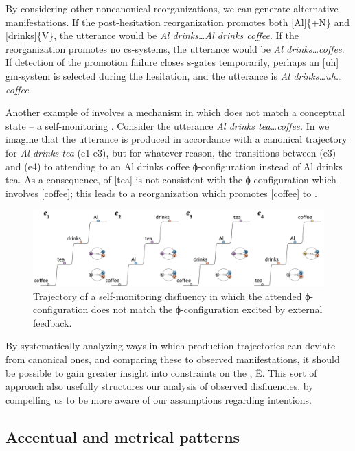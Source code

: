   By considering other noncanonical reorganizations, we can generate alternative manifestations. If the post-hesitation reorganization promotes both [Al]\{+N\} and [drinks]\{V\}, the utterance would be \textit{Al drinks…Al drinks coffee}. If the reorganization promotes no cs-systems, the utterance would be \textit{Al drinks…coffee}. If detection of the promotion failure closes s-gates temporarily, perhaps an [uh] gm-sys\-tem is selected during the hesitation, and the utterance is \textit{Al drinks…uh…coffee}.

  Another example of  involves a mechanism in which  does not match a conceptual state -- a self-monitoring . Consider the utterance \textit{Al drinks tea…coffee.} In {} we imagine that the utterance is produced in accordance with a canonical trajectory for \textit{Al drinks tea} (e1-e3), but for whatever reason, the  transitions between (e3) and (e4) to attending to an {\textbar}Al drinks coffee{\textbar} ϕ-configuration instead of {\textbar}Al drinks tea{\textbar}. As a consequence,  of [tea] is not consistent with the ϕ-configuration which involves [coffee]; this leads to a reorganization which promotes [coffee] to .

  
\begin{figure}
\includegraphics[width=\textwidth]{figures/Tilsen-img62.png}
\caption{Trajectory of a self-monitoring disfluency in which the attended ϕ-configuration does not match the ϕ-configuration excited by external feedback.}
\label{fig:4:12}
\end{figure}
 

  By systematically analyzing ways in which production trajectories can deviate from canonical ones, and comparing these to observed manifestations, it should be possible to gain greater insight into constraints on the , Ê. This sort of approach also usefully structures our analysis of observed disfluencies, by compelling us to be more aware of our assumptions regarding  intentions.

\subsection{Accentual and metrical patterns}

